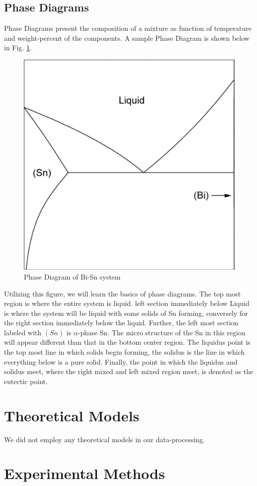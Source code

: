 \documentclass{article}
\begin{document}
\subsection{Phase Diagrams}
Phase Diagrams present the composition of a mixture as function of temperature and weight-percent of the components. A sample Phase Diagram is shown below in Fig. \ref{fig:gen_phasediag}.

\begin{figure}[!h!]
    \centering
    \includegraphics[width=0.5\linewidth]{Lab4/bisn_phasediagram.png}
    \caption{Phase Diagram of Bi-Sn system}
    \label{fig:gen_phasediag}
\end{figure}

Utilizing this figure, we will learn the basics of phase diagrams. The top most region is where the entire system is liquid. left section immediately below Liquid is where the system will be liquid with some solids of Sn forming, conversely for the right section immediately below the liquid. Further, the left most section labeled with $(Sn)$ is $\alpha$-phase Sn. The micro structure of the Sn in this region will appear different than that in the bottom center region. The liquidus point is the top most line in which solids begin forming, the solidus is the line in which everything below is a pure solid. Finally, the point in which the liquidus and solidus meet, where the right mixed and left mixed region meet, is denoted as the eutectic point.


\newpage
\section{Theoretical Models}
We did not employ any theoretical models in our data-processing. 

\section{Experimental Methods}
\end{document}
